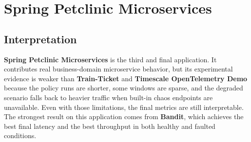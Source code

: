 \documentclass[11pt]{report}
\newcommand{\Bandit}{\textbf{Bandit}}
\newcommand{\TT}{\textbf{Train-Ticket}}
\newcommand{\TS}{\textbf{Timescale OpenTelemetry Demo}}
\newcommand{\SP}{\textbf{Spring Petclinic Microservices}}
\begin{document}
\begin{table}[H]
\centering
\caption{\TS{} policy results}
\end{table}

\section{Spring Petclinic Microservices}
\subsection{Interpretation}
\SP{} is the third and final application. It contributes real business-domain microservice behavior, but its experimental evidence is weaker than \TT{} and \TS{} because the policy runs are shorter, some windows are sparse, and the degraded scenario falls back to heavier traffic when built-in chaos endpoints are unavailable. Even with those limitations, the final metrics are still interpretable. The strongest result on this application comes from \Bandit{}, which achieves the best final latency and the best throughput in both healthy and faulted conditions.
\end{document}
